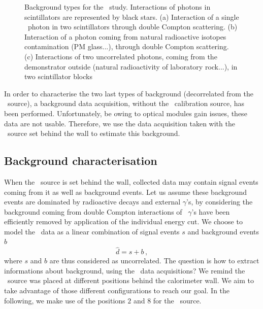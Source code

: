 \begin{figure}[h]
\begin{subfigure}[t]{0.30\textwidth}
    \captionsetup{justification=justified}
    \caption{
      \label{subfig:Co_bkg_3}}
  \end{subfigure}
  \caption{Background types for the \Co\ study.
    Interactions of photons in scintillators are represented by black stars.
    (a) Interaction of a single \Co\ photon in two scintillators through double Compton scattering.
    (b) Interaction of a photon coming from natural radioactive isotopes contamination (PM glass...), through double Compton scattering.
    (c) Interactions of two uncorrelated photons, coming from the demonstrator outside (natural radioactivity of laboratory rock...), in two scintillator blocks
    \label{fig:Co_bkg}}
\end{figure}
In order to characterise the two last types of background (decorrelated from the \Co\ source), a background data acquisition, without the \Co\ calibration source, has been performed.
Unfortunately, be owing to optical modules gain issues, these data are not usable.
Therefore, we use the data acquisition taken with the \Co\ source set behind the wall to estimate this background.

\subsection{Background characterisation}

When the \Co\ source is set behind the wall, collected data may contain signal events coming from it as well as background events.
Let us assume these background events are dominated by radioactive decays and external $\gamma$'s, by considering the background coming from double Compton interactions of \Co\ $\gamma$'s have been efficiently removed by application of the individual energy cut.
We choose to model the \Co\ data as a linear combination of signal events $s$ and background events $b$
\begin{equation}
  \hat{d}=s+b\,,
  \label{eq:estimation_data}
\end{equation}
where $s$ and $b$ are thus considered as uncorrelated.
The question is how to extract informations about background, using the \Co\ data acquisitions?
We remind the \Co\ source was placed at different positions behind the calorimeter wall.
We aim to take advantage of those different configurations to reach our goal.
In the following, we make use of the positions $2$ and $8$ for the \Co\ source.

